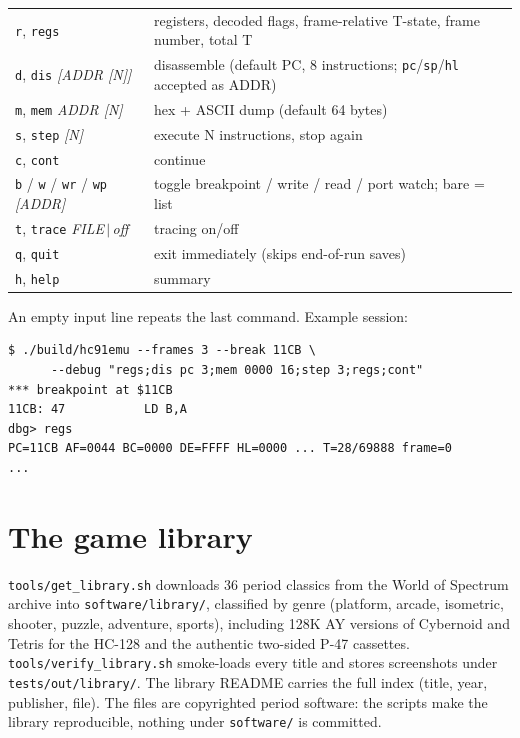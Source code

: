 \documentclass[11pt,a4paper]{article}
\newcommand{\opt}[1]{\texttt{#1}}
\begin{document}
\begin{tabularx}{\textwidth}{lX}
\toprule
\opt{r}, \opt{regs} & registers, decoded flags, frame-relative T-state,
frame number, total T \\
\opt{d}, \opt{dis} \textit{[ADDR [N]]} & disassemble (default PC, 8
instructions; \texttt{pc}/\texttt{sp}/\texttt{hl} accepted as ADDR) \\
\opt{m}, \opt{mem} \textit{ADDR [N]} & hex + ASCII dump (default 64
bytes) \\
\opt{s}, \opt{step} \textit{[N]} & execute N instructions, stop again \\
\opt{c}, \opt{cont} & continue \\
\opt{b} / \opt{w} / \opt{wr} / \opt{wp} \textit{[ADDR]} & toggle
breakpoint / write / read / port watch; bare = list \\
\opt{t}, \opt{trace} \textit{FILE\,$|$\,off} & tracing on/off \\
\opt{q}, \opt{quit} & exit immediately (skips end-of-run saves) \\
\opt{h}, \opt{help} & summary \\
\bottomrule
\end{tabularx}

An empty input line repeats the last command. Example session:

\begin{Verbatim}
$ ./build/hc91emu --frames 3 --break 11CB \
      --debug "regs;dis pc 3;mem 0000 16;step 3;regs;cont"
*** breakpoint at $11CB
11CB: 47           LD B,A
dbg> regs
PC=11CB AF=0044 BC=0000 DE=FFFF HL=0000 ... T=28/69888 frame=0
...
\end{Verbatim}

\section{The game library}

\texttt{tools/get\_library.sh} downloads 36 period classics from the
World of Spectrum archive into \texttt{software/library/}, classified
by genre (platform, arcade, isometric, shooter, puzzle, adventure,
sports), including 128K AY versions of Cybernoid and Tetris for the
HC-128 and the authentic two-sided P-47 cassettes.
\texttt{tools/verify\_library.sh} smoke-loads every title and stores
screenshots under \texttt{tests/out/library/}. The library README
carries the full index (title, year, publisher, file). The files are
copyrighted period software: the scripts make the library
reproducible, nothing under \texttt{software/} is committed.
\end{document}
